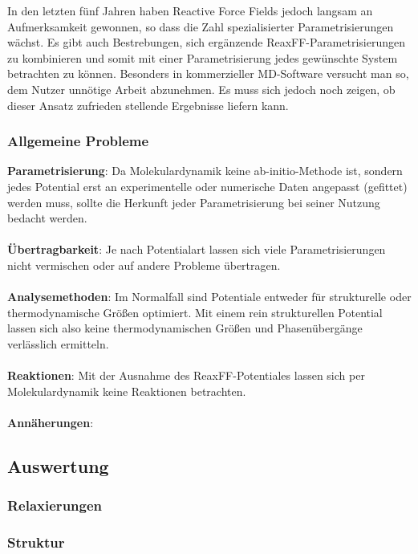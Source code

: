 In den letzten fünf Jahren haben Reactive Force Fields jedoch langsam an Aufmerksamkeit gewonnen, so dass die Zahl spezialisierter Parametrisierungen wächst.
Es gibt auch Bestrebungen, sich ergänzende ReaxFF-Parametrisierungen zu kombinieren und somit mit einer Parametrisierung jedes gewünschte System betrachten zu können.
Besonders in kommerzieller MD-Software versucht man so, dem Nutzer unnötige Arbeit abzunehmen.
Es muss sich jedoch noch zeigen, ob dieser Ansatz zufrieden stellende Ergebnisse liefern kann.

\subsubsection{Allgemeine Probleme}

\textbf{Parametrisierung}:
Da Molekulardynamik keine ab-initio-Methode ist, sondern jedes Potential erst an experimentelle oder numerische Daten angepasst (gefittet) werden muss, sollte die Herkunft jeder Parametrisierung bei seiner Nutzung bedacht werden.
\\\\
\textbf{Übertragbarkeit}:
Je nach Potentialart lassen sich viele Parametrisierungen nicht vermischen oder auf andere Probleme übertragen.
\\\\
\textbf{Analysemethoden}:
Im Normalfall sind Potentiale entweder für strukturelle oder thermodynamische Größen optimiert.
Mit einem rein strukturellen Potential lassen sich also keine thermodynamischen Größen und Phasenübergänge verlässlich ermitteln.
\\\\
\textbf{Reaktionen}:
Mit der Ausnahme des ReaxFF-Potentiales lassen sich per Molekulardynamik keine Reaktionen betrachten.
\\\\
\textbf{Annäherungen}:

\subsection{Auswertung}

\subsubsection{Relaxierungen}

\subsubsection{Struktur}

